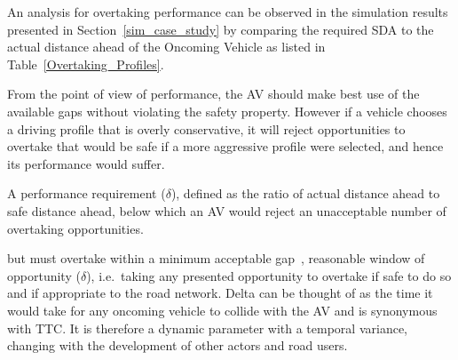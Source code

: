 An analysis for overtaking performance can be observed in the simulation results presented in Section~\ref{sim_case_study} by comparing the required SDA to the actual distance ahead of the Oncoming Vehicle as listed in Table~\ref{Overtaking_Profiles}. 

From the point of view of performance, the AV should make best use of the available gaps without violating the safety property. However if a vehicle chooses a driving profile that is overly conservative, it will reject opportunities to overtake that would be safe if a more aggressive profile were selected, and hence its performance would suffer.

A performance requirement ($\delta$), defined as the ratio of actual distance ahead to safe distance ahead, below which an AV would reject an unacceptable number of overtaking opportunities. 



%
 but must overtake 
within a minimum acceptable gap~\cite{mahmassani1981using},
reasonable window of opportunity ($\delta$), 
i.e.\ taking any presented opportunity to overtake if safe to do so and if appropriate to the road network. 
%
Delta can be thought of as the time it would take for any oncoming vehicle to collide with the AV and is synonymous with TTC. %
It is therefore a dynamic parameter with a temporal variance, changing with the development of other actors and road users.
%


